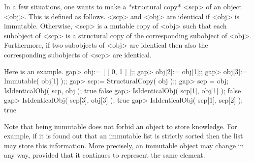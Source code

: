 In a few situations,
one wants to make a *structural copy* <scp> of an object <obj>.
This is defined as follows.
<scp> and <obj> are identical if <obj> is immutable.
Otherwise, <scp> is a mutable copy of <obj> such that
each subobject of <scp> is a structural copy of the corresponding
subobject of <obj>.
Furthermore, if two subobjects of <obj> are identical then
also the corresponding subobjects of <scp> are identical. 

Here is an example.
\beginexample
    gap> obj:= [ [ 0, 1 ] ];;
    gap> obj[2]:= obj[1];;
    gap> obj[3]:= Immutable( obj[1] );;
    gap> scp:= StructuralCopy( obj );;
    gap> scp = obj; IsIdenticalObj( scp, obj );
    true
    false
    gap> IsIdenticalObj( scp[1], obj[1] );
    false
    gap> IsIdenticalObj( scp[3], obj[3] );
    true
    gap> IsIdenticalObj( scp[1], scp[2] );
    true
\endexample

Note that being immutable does not forbid an object to store knowledge.
For example, if it is found out that an immutable list is strictly
sorted then the list may store this information.
More precisely, an immutable object may change in any way,
provided that it continues to represent the same element.

